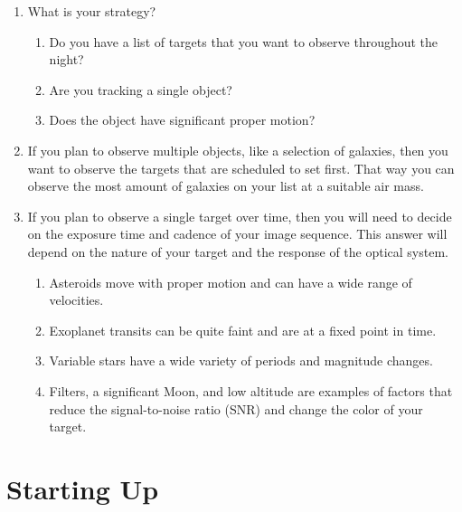 \documentclass{article}
\begin{document}
	\begin{enumerate}
		
		\item What is your strategy?
		
		\begin{enumerate}
			
			\item Do you have a list of targets that you want to observe throughout the night?
			
			\item Are you tracking a single object?
			
			\item Does the object have significant proper motion?
			
		\end{enumerate}
		
		\item If you plan to observe multiple objects, like a selection of galaxies, then you want to observe the targets that are scheduled to set first. That way you can observe the most amount of galaxies on your list at a suitable air mass.
		
		\item If you plan to observe a single target over time, then you will need to decide on the exposure time and cadence of your image sequence. This answer will depend on the nature of your target and the response of the optical system.
		
		\begin{enumerate}
			
			\item Asteroids move with proper motion and can have a wide range of velocities.
			
			\item Exoplanet transits can be quite faint and are at a fixed point in time.
			
			\item Variable stars have a wide variety of periods and magnitude changes.
			
			\item Filters, a significant Moon, and low altitude are examples of factors that reduce the signal-to-noise ratio (SNR) and change the color of your target.
			
		\end{enumerate}
		
	\end{enumerate}
	
	\newpage
	\section{Starting Up}
	\label{sec:starting-up}
	
\end{document}
